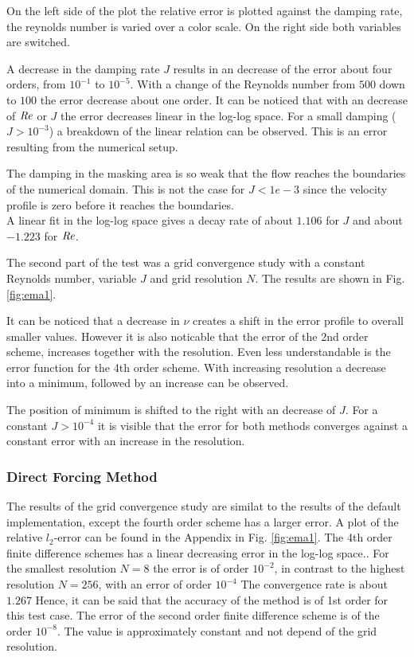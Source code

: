 On the left side of the plot the relative error is plotted against the damping rate, the reynolds number is
varied over a color scale. On the right side both variables are switched.

A decrease in the damping rate $J$ results in an decrease of the error about four orders, from $10^{-1}$ to $10^{-5}$.
With a change of the Reynolds number from $500$ down to $100$ the error decrease about one order.
It can be noticed that with an decrease of $\mbox{\textit{Re}}$ or $J$ the error decreases linear in the log-log space.
For a small damping ($J>10^{-3}$) a breakdown of the linear relation can be observed.
This is an error resulting from the numerical setup.
\clearpage

The damping in the masking area is so weak that the flow reaches the  boundaries of the numerical domain.
This is not the case for $J<1e-3$ since the velocity profile is zero before it reaches the boundaries.\\
A linear fit in the log-log space gives a  decay rate of about $1.106$ for  $J$ and about $-1.223$ for $\mbox{\textit{Re}}$.

The second part of the test was a grid convergence study with a constant Reynolds number, variable $J$ and grid resolution $N$.
The results are shown in Fig. \ref{fig:ema1}.

It can be noticed that a decrease in $\nu$ creates a shift in the error profile to overall smaller values.
However it is also noticable that the error of the 2nd order scheme, increases together with the resolution.
Even less understandable is the error function for the 4th order scheme.
With increasing resolution  a decrease into a minimum, followed by an increase can be observed.

The position of minimum is shifted to the right with an decrease of $J$.
For a constant $J>10^{-4}$ it is visible that the error for both methods converges against a
constant error  with an increase in the resolution.

\subsubsection{Direct Forcing Method}

The results of the grid convergence study are similat to the results of the default implementation,
except the fourth order scheme has a larger error.
A plot of the relative $l_2$-error can be found in the Appendix  in Fig. \ref{fig:ema1}.
The 4th order finite difference schemes has a linear decreasing error in the log-log space..
For the smallest resolution $N=8$ the error is of order $10^{-2}$,
in contrast to the highest resolution $N=256$, with an error of order $10^{-4}$
The convergence rate is about $1.267$
Hence, it can be said that the accuracy of the method is of 1st order for this test case.
The error of the second order finite difference scheme is of the order $10^{-8}$.
The value is approximately constant and not depend of the grid resolution.


